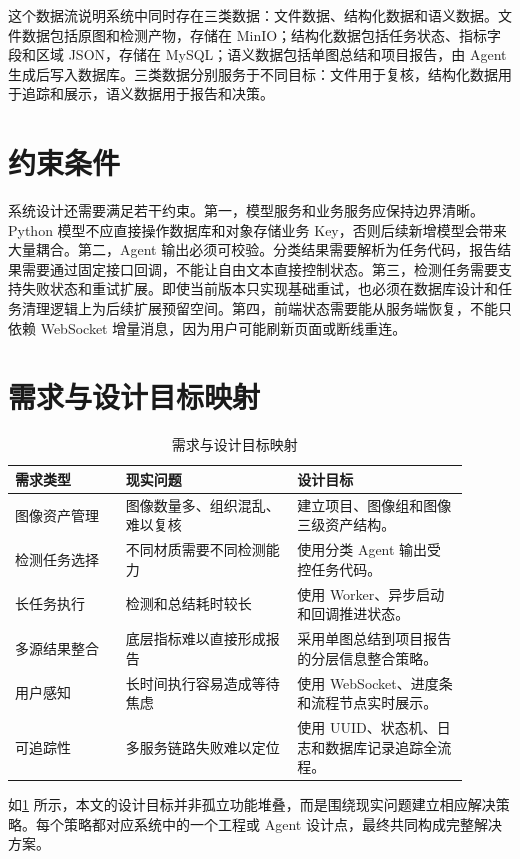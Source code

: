 这个数据流说明系统中同时存在三类数据：文件数据、结构化数据和语义数据。文件数据包括原图和检测产物，存储在 MinIO；结构化数据包括任务状态、指标字段和区域 JSON，存储在 MySQL；语义数据包括单图总结和项目报告，由 Agent 生成后写入数据库。三类数据分别服务于不同目标：文件用于复核，结构化数据用于追踪和展示，语义数据用于报告和决策。

\section{约束条件}
\label{sec:constraints}

系统设计还需要满足若干约束。第一，模型服务和业务服务应保持边界清晰。Python 模型不应直接操作数据库和对象存储业务 Key，否则后续新增模型会带来大量耦合。第二，Agent 输出必须可校验。分类结果需要解析为任务代码，报告结果需要通过固定接口回调，不能让自由文本直接控制状态。第三，检测任务需要支持失败状态和重试扩展。即使当前版本只实现基础重试，也必须在数据库设计和任务清理逻辑上为后续扩展预留空间。第四，前端状态需要能从服务端恢复，不能只依赖 WebSocket 增量消息，因为用户可能刷新页面或断线重连。

\section{需求与设计目标映射}
\label{sec:requirement-goal-map}

\begin{table}[!htb]
  \caption{需求与设计目标映射}\label{tab:requirement-goal-map}
  \centering
  \begin{tabular}{@{}p{0.22\linewidth}p{0.34\linewidth}p{0.34\linewidth}@{}} \toprule
    \textbf{需求类型} & \textbf{现实问题} & \textbf{设计目标} \\ \midrule
    图像资产管理 & 图像数量多、组织混乱、难以复核 & 建立项目、图像组和图像三级资产结构。 \\
    检测任务选择 & 不同材质需要不同检测能力 & 使用分类 Agent 输出受控任务代码。 \\
    长任务执行 & 检测和总结耗时较长 & 使用 Worker、异步启动和回调推进状态。 \\
    多源结果整合 & 底层指标难以直接形成报告 & 采用单图总结到项目报告的分层信息整合策略。 \\
    用户感知 & 长时间执行容易造成等待焦虑 & 使用 WebSocket、进度条和流程节点实时展示。 \\
    可追踪性 & 多服务链路失败难以定位 & 使用 UUID、状态机、日志和数据库记录追踪全流程。 \\ \bottomrule
  \end{tabular}
\end{table}

如\cref{tab:requirement-goal-map} 所示，本文的设计目标并非孤立功能堆叠，而是围绕现实问题建立相应解决策略。每个策略都对应系统中的一个工程或 Agent 设计点，最终共同构成完整解决方案。
